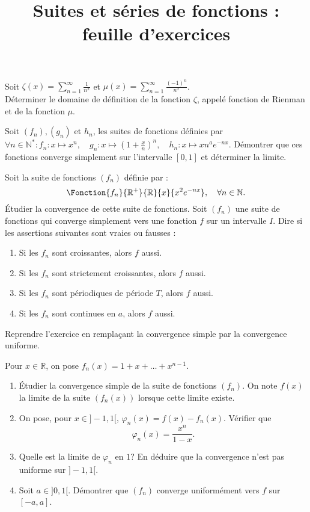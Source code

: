 \documentclass{yann}
\begin{document}
\title{Suites et séries de fonctions : feuille d'exercices}
\maketitle
{}
Soit $\zeta(x)=\sum_{n=1}^\infty \frac{1}{n^x}$ et $\mu(x)=\sum_{n=1}^\infty \frac{(-1)^n}{n^x}$.\\
Déterminer le domaine de définition de la fonction $\zeta$, appelé fonction de Rienman et de la fonction $\mu$. 



Soit $(f_n), (g_n)$ et $h_n$, les suites de fonctions définies par   $\forall n \in \mathbb{N}^* : f_n: x\mapsto x^n,\quad g_n: x\mapsto (1+\frac x n)^n,\quad h_n:x\mapsto x n^a e^{-nx}$.
Démontrer que ces fonctions converge simplement sur l'intervalle $[0,1]$ et déterminer la limite. 

Soit la suite de fonctions $(f_n)$ définie par : 
$$\Fonction{f_n}{\mathbb{R}^+}{\mathbb{R}}{x}{x^2e^{-nx}}, \quad \forall n \in \mathbb{N}.$$
Étudier la convergence de cette suite de fonctions. 
Soit $(f_n)$ une suite de fonctions qui converge simplement vers une fonction $f$ sur un intervalle $I$. Dire si les assertions suivantes sont vraies ou fausses :
\begin{enumerate}
\item Si les $f_n$ sont croissantes, alors $f$ aussi.
\item Si les $f_n$ sont strictement croissantes, alors $f$ aussi.
\item Si les $f_n$ sont périodiques de période $T$, alors $f$ aussi.
\item Si les $f_n$ sont continues en $a$, alors $f$ aussi.
\end{enumerate}
Reprendre l'exercice en remplaçant la convergence simple par la convergence uniforme.


Pour $x\in\mathbb R$, on pose $f_n(x)=1+x+\dots+x^{n-1}$.
\begin{enumerate}
\item \'Etudier la convergence simple de la suite de fonctions $(f_n)$. On note $f(x)$ la limite de la suite $(f_n(x))$ lorsque cette limite existe.
\item On pose, pour $x\in ]-1,1[$, $\varphi_n(x)=f(x)-f_n(x)$. Vérifier que 
$$\varphi_n(x)=\frac{x^n}{1-x}.$$
\item Quelle est la limite de $\varphi_n$ en $1$? En déduire que la convergence n'est pas uniforme sur $]-1,1[$. 
\item Soit $a\in ]0,1[$. Démontrer que $(f_n)$ converge uniformément vers $f$ sur $[-a,a]$.
\end{enumerate}
\end{document}
